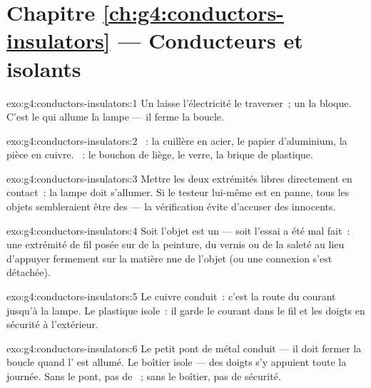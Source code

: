 \section*{Chapitre \ref{ch:g4:conductors-insulators} --- Conducteurs et isolants}

\begin{solution}{exo:g4:conductors-insulators:1}
Un  laisse l'électricité le traverser~; un  la
bloque. C'est le  qui allume la lampe --- il ferme la
boucle.
\end{solution}

\begin{solution}{exo:g4:conductors-insulators:2}
~: la cuillère en acier, le papier d'aluminium, la pièce
en cuivre. ~: le bouchon de liège, le verre, la brique de
plastique.
\end{solution}

\begin{solution}{exo:g4:conductors-insulators:3}
Mettre les deux extrémités libres directement en contact~: la lampe
doit s'allumer. Si le testeur lui-même est en panne, tous les objets
sembleraient être des  --- la vérification évite d'accuser
des innocents.
\end{solution}

\begin{solution}{exo:g4:conductors-insulators:4}
Soit l'objet est un  --- soit l'essai a été mal fait~: une
extrémité de fil posée sur de la peinture, du vernis ou de la
saleté au lieu d'appuyer fermement sur la matière nue de l'objet (ou
une connexion s'est détachée).
\end{solution}

\begin{solution}{exo:g4:conductors-insulators:5}
Le cuivre conduit~: c'est la route du courant jusqu'à la lampe. Le
plastique isole~: il garde le courant dans le fil et les doigts en
sécurité à l'extérieur.
\end{solution}

\begin{solution}{exo:g4:conductors-insulators:6}
Le petit pont de métal conduit --- il doit fermer la boucle quand
l' est allumé. Le boîtier isole --- des doigts s'y
appuient toute la journée. Sans le pont, pas de ~; sans le
boîtier, pas de sécurité.
\end{solution}

